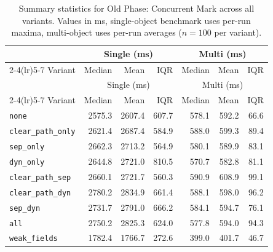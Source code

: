 \begin{longtable}[c]{l rrr rrr}
\caption[Old Phase: Concurrent Mark summary statistics]{Summary statistics for Old Phase: Concurrent Mark across all variants. Values in ms, single-object benchmark uses per-run maxima, multi-object uses per-run averages ($n=100$ per variant).}\label{tab:stats-old_concurrent_mark} \\
\toprule
 & \multicolumn{3}{c}{Single (ms)} & \multicolumn{3}{c}{Multi (ms)} \\
\cmidrule(lr){2-4}\cmidrule(lr){5-7}
Variant & Median & Mean & IQR & Median & Mean & IQR \\
\midrule
\endfirsthead
\toprule
 & \multicolumn{3}{c}{Single (ms)} & \multicolumn{3}{c}{Multi (ms)} \\
\cmidrule(lr){2-4}\cmidrule(lr){5-7}
Variant & Median & Mean & IQR & Median & Mean & IQR \\
\midrule
\endhead
\bottomrule
\endfoot
\texttt{none} & 2575.3 & 2607.4 & 607.7 & 578.1 & 592.2 & 66.6 \\
\texttt{clear\_path\_only} & 2621.4 & 2687.4 & 584.9 & 588.0 & 599.3 & 89.4 \\
\texttt{sep\_only} & 2662.3 & 2713.2 & 564.9 & 580.1 & 589.9 & 83.1 \\
\texttt{dyn\_only} & 2644.8 & 2721.0 & 810.5 & 570.7 & 582.8 & 81.1 \\
\texttt{clear\_path\_sep} & 2660.1 & 2721.7 & 560.3 & 590.9 & 608.9 & 99.1 \\
\texttt{clear\_path\_dyn} & 2780.2 & 2834.9 & 661.4 & 588.1 & 598.0 & 96.2 \\
\texttt{sep\_dyn} & 2731.7 & 2791.0 & 666.2 & 584.1 & 594.7 & 76.1 \\
\texttt{all} & 2750.2 & 2825.3 & 624.0 & 577.8 & 594.0 & 94.3 \\
\texttt{weak\_fields} & 1782.4 & 1766.7 & 272.6 & 399.0 & 401.7 & 46.7 \\
\end{longtable}
